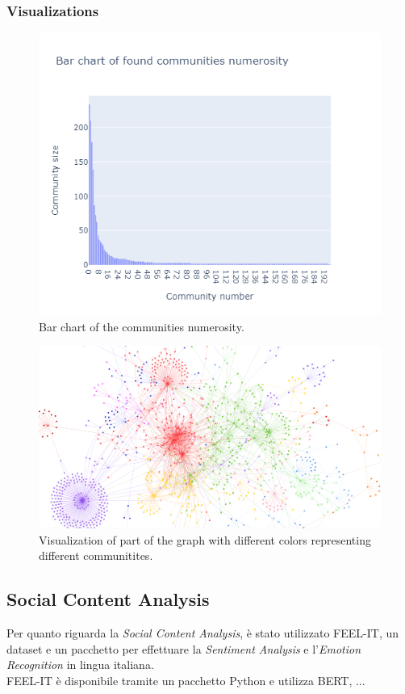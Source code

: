\documentclass[12pt,journal,compsoc]{IEEEtran}
\begin{document}
\subsubsection{Visualizations}
\begin{figure}[H]
	\includegraphics[scale=.5]{./images/newplot.png}
	\caption{Bar chart of the communities numerosity.}
\end{figure}

\begin{figure}[H]
	\includegraphics[scale=.20]{./images/graph_visualization.png}
	\caption{Visualization of part of the graph with different colors representing different communitites.}
\end{figure}
\subsection{Social Content Analysis}
Per quanto riguarda la \textit{Social Content Analysis}, è stato utilizzato FEEL-IT, un dataset e un pacchetto per effettuare la \textit{Sentiment Analysis} e l'\textit{Emotion Recognition} in lingua italiana.\\
FEEL-IT è disponibile tramite un pacchetto Python \cite{FEEL-IT} e utilizza BERT, ...
\end{document}
